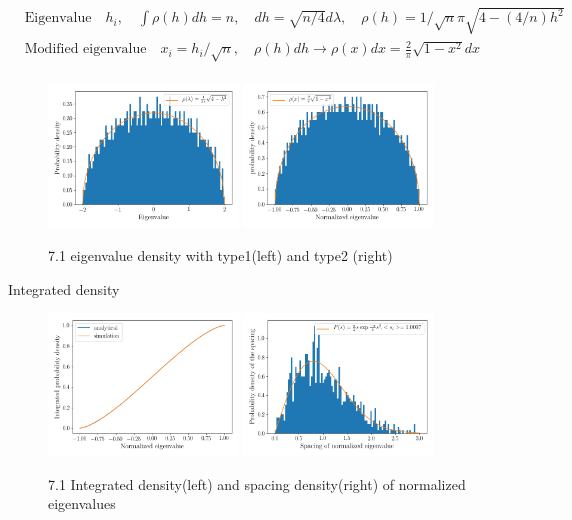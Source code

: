 \documentclass[paper=a4, fontsize=11pt]{scrartcl} %
\numberwithin{equation}{section} %
\numberwithin{figure}{section} %
\numberwithin{table}{section} %
\begin{document}
\begin{align*}
  &\text{Eigenvalue} \quad h_{i}, \quad \int \rho(h)  dh = n, \quad dh = \sqrt{n/4}d\lambda,  \quad \rho(h) = 1/\sqrt{n}\pi\sqrt{4-(4/n)h^2}\\
&\text{Modified eigenvalue} \quad   x_{i} =  h_{i}/\sqrt{n}, \quad   \rho(h)d h \rightarrow  \rho(x) d x= \frac{2}{\pi}\sqrt{1-x^2} dx\\
\end{align*}

\begin{figure}[ht]
  \includegraphics[width = 0.45\textwidth]{figures/figure_7_1_1.png}
  \hfill
  \includegraphics[width = 0.45\textwidth]{figures/figure_7_1_2.png}
  \caption{7.1 eigenvalue density with type1(left) and type2 (right)}
  \label{fig:1}
\end{figure}

Integrated density 

\begin{figure}[ht]
  \includegraphics[width = 0.45\textwidth]{figures/figure_7_1_integrated.png}
  \hfill
  \includegraphics[width = 0.45\textwidth]{figures/figure_7_1_spacing.png}
  \caption{7.1 Integrated density(left) and spacing density(right) of normalized eigenvalues}
  \label{fig:1}
\end{figure}
\end{document}
